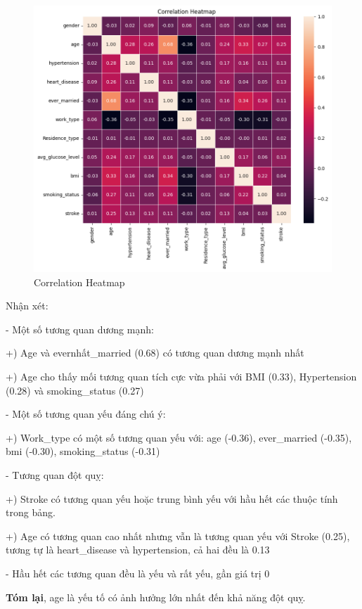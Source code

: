 \documentclass[11pt]{article}
\begin{document}
	\begin{figure}[H]
		\centering
		\includegraphics[width=0.7\linewidth]{correlationHeatmap}
		\caption{Correlation Heatmap}
		\label{fig:correlationheatmap}
	\end{figure}
	Nhận xét:
	
	
	 \begin{flushleft}
	 	- Một số tương quan dương mạnh:
	 	
	 	+) Age và evernhất\_married (0.68) có tương quan dương mạnh nhất
	 	
	 	+) Age cho thấy mối tương quan tích cực vừa phải với BMI (0.33), Hypertension (0.28) và smoking\_status (0.27)
	 	\vspace{0.2cm}
	 	
	 	- Một số tương quan yếu đáng chú ý:
	 	
	 	+) Work\_type có một số tương quan yếu với: age (-0.36), ever\_married (-0.35), bmi (-0.30), smoking\_status (-0.31)
	 	\vspace{0.2cm}
	 	
	 	- Tương quan đột quỵ:
	 	
	 	+) Stroke có tương quan yếu hoặc trung bình yếu với hầu hết các thuộc tính trong bảng.
	 	
	 	+) Age có tương quan cao nhất nhưng vẫn là tương quan yếu với Stroke (0.25), tương tự là heart\_disease và hypertension, cả hai đều là 0.13
	 	\vspace{0.2cm}
	 	
	 	- Hầu hết các tương quan đều là yếu và rất yếu, gần giá trị 0
	 	\vspace{0.2cm}
	 	
	 	\textbf{Tóm lại}, age là yếu tố có ảnh hưởng lớn nhất đến khả năng đột quỵ.
	 \end{flushleft}
	 
\end{document}
